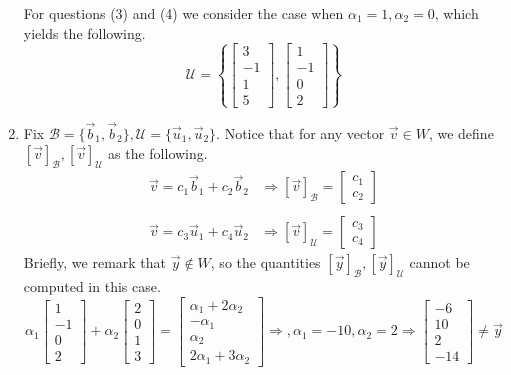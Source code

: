 \begin{SaveQuestion}
\begin{enumerate}
        For questions (3) and (4) we consider the case when $\alpha_1 = 1, \alpha_2 = 0$, which yields the following. 
        $$\mathcal U = \left\{\begin{bmatrix} 3 \\ -1 \\ 1 \\ 5 \end{bmatrix},  \begin{bmatrix} 1 \\ -1 \\ 0 \\ 2 \end{bmatrix}\right\}$$
        \item Fix $\mathcal B = \{\vec b_1, \vec b_2\}, \mathcal U = \{\vec u_1, \vec u_2\}$. Notice that for any vector $\vec v \in W$, we define $[\vec v]_{\mathcal B}, [\vec v]_{\mathcal U}$ as the following.
        $$\begin{array}{cr}
            \vec v = c_1 \vec b_1 + c_2 \vec b_2 & \Longrightarrow [\vec v]_{\mathcal B} = \begin{bmatrix} c_1 \\ c_2 \end{bmatrix} \\ \\
            \vec v = c_3 \vec u_1 + c_4 \vec u_2 & \Longrightarrow [\vec v]_{\mathcal U} = \begin{bmatrix} c_3 \\ c_4 \end{bmatrix}
        \end{array}$$
        Briefly, we remark that $\vec y \not\in W$, so the quantities $[\vec y]_{\mathcal B}, [\vec y]_{\mathcal U}$ cannot be computed in this case. 
        $$\alpha_1 \begin{bmatrix} 1 \\ -1 \\ 0 \\ 2 \end{bmatrix} + \alpha_2 \begin{bmatrix} 2 \\ 0 \\ 1 \\ 3 \end{bmatrix} = \begin{bmatrix} \alpha_1 + 2 \alpha _2 \\ - \alpha_1 \\ \alpha_2 \\ 2\alpha_1 + 3\alpha_2 \end{bmatrix} \Longrightarrow, \alpha_1 = -10, \alpha_2 = 2 \Longrightarrow  \begin{bmatrix} -6 \\ 10 \\ 2 \\ -14 \end{bmatrix} \neq \vec y$$

\end{enumerate}
\end{SaveQuestion}
